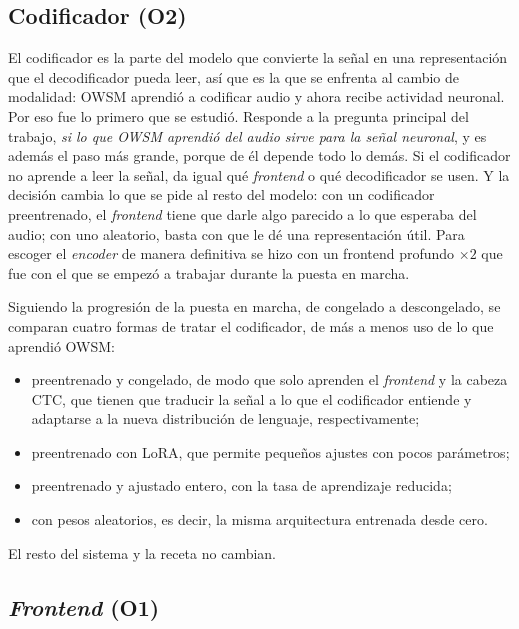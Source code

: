 \subsection{Codificador (O2)}

El codificador es la parte del modelo que convierte la señal en una representación que el decodificador pueda leer, así que es la que se enfrenta al cambio de modalidad: OWSM aprendió a codificar audio y ahora recibe actividad neuronal. Por eso fue lo primero que se estudió. Responde a la pregunta principal del trabajo, \textit{si lo que OWSM aprendió del audio sirve para la señal neuronal}, y es además el paso más grande, porque de él depende todo lo demás. Si el codificador no aprende a leer la señal, da igual qué \textit{frontend} o qué decodificador se usen. Y la decisión cambia lo que se pide al resto del modelo: con un codificador preentrenado, el \textit{frontend} tiene que darle algo parecido a lo que esperaba del audio; con uno aleatorio, basta con que le dé una representación útil. Para escoger el \textit{encoder} de manera definitiva se hizo con un frontend profundo $\times 2$ que fue con el que se empezó a trabajar durante la puesta en marcha.

Siguiendo la progresión de la puesta en marcha, de congelado a descongelado, se comparan cuatro formas de tratar el codificador, de más a menos uso de lo que aprendió OWSM:

\begin{itemize}[leftmargin=*, itemsep=0.3em]
  \item preentrenado y congelado, de modo que solo aprenden el \textit{frontend} y la cabeza CTC, que tienen que traducir la señal a lo que el codificador entiende y adaptarse a la nueva distribución de lenguaje, respectivamente;
  \item preentrenado con LoRA, que permite pequeños ajustes con pocos parámetros;
  \item preentrenado y ajustado entero, con la tasa de aprendizaje reducida;
  \item con pesos aleatorios, es decir, la misma arquitectura entrenada desde cero.
\end{itemize}

El resto del sistema y la receta no cambian.

\subsection{\textit{Frontend} (O1)}


